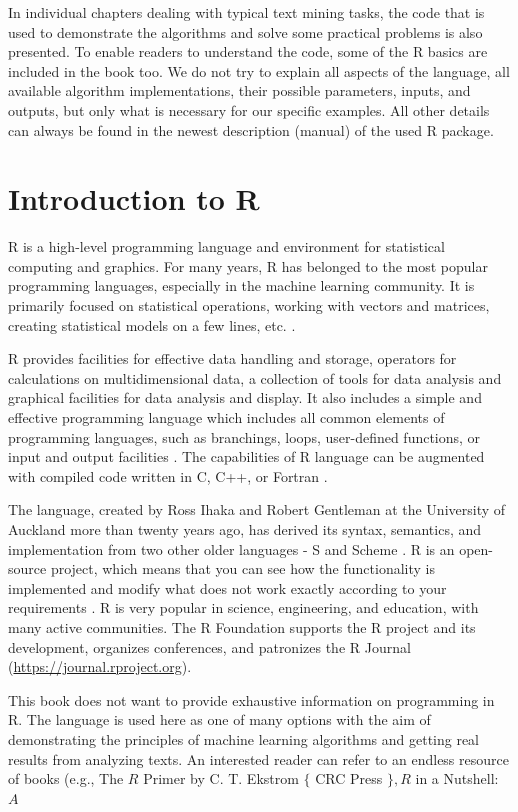 \documentclass[11pt,openany,executivepaper]{book}
\begin{document}
In individual chapters dealing with typical text mining tasks, the code that is used to demonstrate the algorithms and solve some practical problems is also presented. To enable readers to understand the code, some of the R basics are included in the book too. We do not try to explain all aspects of the language, all available algorithm implementations, their possible parameters, inputs, and outputs, but only what is necessary for our specific examples. All other details can always be found in the newest description (manual) of the used R package.

\chapter{Introduction to R}
R is a high-level programming language and environment for statistical computing and graphics. For many years, R has belonged to the most popular programming languages, especially in the machine learning community. It is primarily focused on statistical operations, working with vectors and matrices, creating statistical models on a few lines, etc. \cite{209}.

R provides facilities for effective data handling and storage, operators for calculations on multidimensional data, a collection of tools for data analysis and graphical facilities for data analysis and display. It also includes a simple and effective programming language which includes all common elements of programming languages, such as branchings, loops, user-defined functions, or input and output facilities \cite{117}. The capabilities of R language can be augmented with compiled code written in C, C++, or Fortran \cite{80}.

The language, created by Ross Ihaka and Robert Gentleman at the University of Auckland more than twenty years ago, has derived its syntax, semantics, and implementation from two other older languages - S and Scheme \cite{125}. R is an open-source project, which means that you can see how the functionality is implemented and modify what does not work exactly according to your requirements \cite{203}. R is very popular in science, engineering, and education, with many active communities. The R Foundation supports the R project and its development, organizes conferences, and patronizes the R Journal (\href{https://journal.rproject.org}{https://journal.rproject.org}).

This book does not want to provide exhaustive information on programming in R. The language is used here as one of many options with the aim of demonstrating the principles of machine learning algorithms and getting real results from analyzing texts. An interested reader can refer to an endless resource of books (e.g., The $R$ Primer by C. T. Ekstrom $\{$ CRC Press $\}, R$ in a Nutshell: $A$
\end{document}

